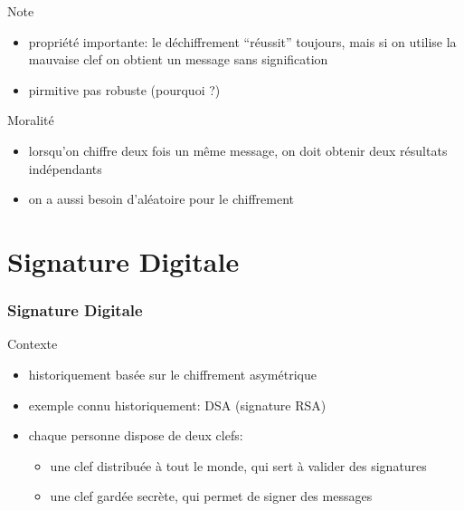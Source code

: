 \begin{reveals}
\begin{frame}
  \vfill

  \begin{block}{Note}
    \begin{itemize}
    \item propriété importante: le déchiffrement ``réussit'' toujours,
      mais si on utilise la mauvaise clef on obtient un message sans signification
    \item pirmitive pas robuste (pourquoi ?)
    \end{itemize}
  \end{block}

  \vfill
  
  \begin{block}{Moralité}
    \begin{itemize}
    \item lorsqu'on chiffre deux fois un même message, on doit obtenir
      deux résultats indépendants
    \item on a aussi besoin d'aléatoire pour le chiffrement
    \end{itemize}
  \end{block}

  \vfill

\end{frame}

\section{Signature Digitale}




\begin{frame}
  \frametitle{Signature Digitale}

  \vfill
  
  \begin{block}{Contexte}
    \begin{itemize}
    \item historiquement basée sur le chiffrement asymétrique 
    \item exemple connu historiquement: DSA (signature RSA)
    \item chaque personne dispose de deux clefs:
      \begin{itemize}
      \item une clef distribuée à tout le monde, qui sert à valider des signatures
      \item une clef gardée secrète, qui permet de signer des messages
      \end{itemize}
    \end{itemize}
  \end{block}
  

\end{frame}
\end{reveals}
